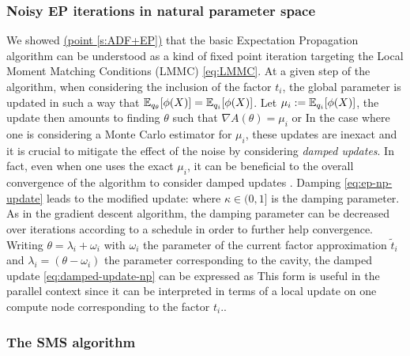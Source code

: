 \subsubsection*{Noisy EP iterations in natural parameter space}
We showed \hyperref[s:ADF+EP]{(point \ref*{s:ADF+EP})} that the basic Expectation Propagation algorithm can be understood as a kind of fixed point iteration targeting the Local Moment Matching Conditions (LMMC) \eqref{eq:LMMC}.
At a given step of the algorithm, when considering the inclusion of the factor $t_i$, the global parameter is updated in such a way that $\mathbb E_{q_\theta}[\phi(X)]= \mathbb E_{q_i}[\phi(X)]$. Let $\mu_i:=\mathbb E_{q_i}[\phi(X)]$, the update then amounts to finding $\theta$ such that $\nabla A(\theta) = \mu_i$ or
%
%
In the case where one is considering a Monte Carlo estimator for $\mu_i$, these updates are inexact and it is crucial to mitigate the effect of the noise by considering \emph{damped updates}. In fact, even when one uses the exact $\mu_i$, it can be beneficial to the overall convergence of the algorithm to consider damped updates . Damping \eqref{eq:ep-np-update} leads to the modified update:
%
%
where $\kappa \in(0,1]$ is the damping parameter. As in the gradient descent algorithm, the damping parameter can be decreased over iterations according to a schedule in order to further help convergence.
Writing $\theta=\lambda_i+\omega_i$ with $\omega_i$ the parameter of the current factor approximation $\tilde t_i$ and $\lambda_i=(\theta-\omega_i)$ the parameter corresponding to the cavity, the damped update \eqref{eq:damped-update-np} can be expressed as
%
%
This form is useful in the parallel context since it can be interpreted in terms of a local update on one compute node corresponding to the factor $t_i$..
\subsubsection*{The SMS algorithm}

\subsection{}
